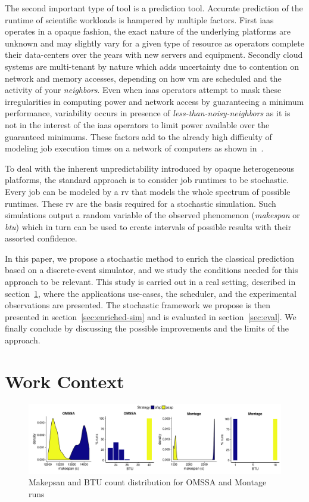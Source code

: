 \documentclass[10pt,conference,compsocconf]{IEEEtran}
\begin{document}
The second important  type of tool is a prediction  tool. Accurate prediction of
the  runtime of  scientific workloads  is  hampered by  multiple factors.  First
\ac{iaas}  operates in  a opaque  fashion, the  exact nature  of the  underlying
platforms are  unknown and  may slightly vary  for a given  type of  resource as
operators  complete their  data-centers  over  the years  with  new servers  and
equipment.   Secondly  cloud  systems  are  multi-tenant  by  nature  which adds
uncertainty due to  contention on network and memory accesses,  depending on how
\ac{vm}  are scheduled  and the  activity of  your \emph{neighbors}.   Even when
\ac{iaas} operators attempt to mask  these irregularities in computing power and
network  access by  guaranteeing a  minimum performance,  variability occurs  in
presence of \emph{less-than-noisy-neighbors} as it is not in the interest of the
\ac{iaas} operators to limit power  available over the guaranteed minimums.
These factors add to the already  high difficulty of modeling job execution times
on a network of computers as shown in~\cite{Lastovetsky05}.

To deal  with the inherent  unpredictability introduced by  opaque heterogeneous
platforms, the standard approach is to  consider job runtimes to be stochastic.
Every job can be modeled by a \ac{rv} that models the whole spectrum of possible
runtimes. These  \ac{rv} are  the basis required  for a  stochastic simulation.
Such  simulations   output  a  random   variable  of  the   observed  phenomenon
(\emph{makespan}  or  \emph{\ac{btu}}) which  in  turn  can  be used  to  create
intervals of possible  results with their assorted confidence. 

In this paper, we propose a stochastic method to enrich the classical prediction
based on a discrete-event simulator, and  we study the conditions needed for this
approach to be relevant. This study is  carried out in a real setting, described
in  section~\ref{sec:work-context},   where  the  applications   use-cases,  the
scheduler, and  the  experimental  observations are  presented.  The  stochastic
framework we propose is  then presented in section~\ref{sec:enriched-sim} and
is evaluated in section~\ref{sec:eval}. We finally conclude by discussing the 
possible improvements and the limits of the approach.


\section{Work Context}
\label{sec:work-context}
\begin{figure}
	\centering
	\includegraphics[width=\textwidth]{gfx/real_plot.pdf}
	\caption{Makepsan and BTU count distribution for OMSSA and Montage
	runs\label{fig:realbrs}}
\end{figure}
\end{document}
